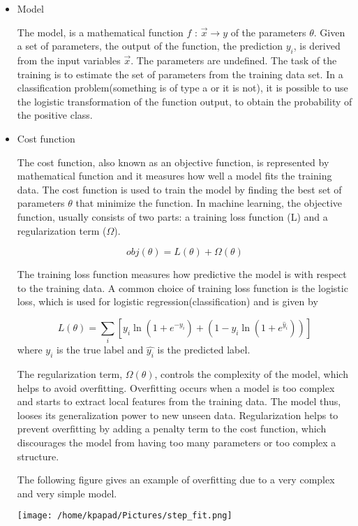 \begin{itemize}
\item Model
\label{sec:org31e7a41}

The model, is a mathematical function \(f\text{ : } \vec{x} \rightarrow y\) of the parameters \(\theta\). Given a set of parameters, the output of the function, the prediction \(y_{i}\), is derived from the input variables \(\vec{x}\).
The parameters are undefined. The task of the training is to estimate the set of parameters from the training data set.
In a classification problem(something is of type a or it is not), it is possible to use the logistic transformation of the function output, to obtain the probability of the positive class.

\item Cost function
\label{sec:orgac31e22}

The cost function, also known as an objective function, is represented by mathematical function and it measures how well a model fits the training data. The cost function is used to train the model by finding the best set of parameters \(\theta\) that minimize the function.
In machine learning, the objective function, usually consists of two parts: a training loss function (L) and a regularization term (\(\Omega\)).

\[
obj(\theta) = L(\theta) + \Omega(\theta)
\]

The training loss function measures how predictive the model is with respect to the training data. A common choice of training loss function is the logistic loss, which is used for logistic regression(classification) and is given by

\[
L(\theta) = \sum_{i}[ y_{i}\ln(1+e^{-\hat{y_{i}}})+(1-y_{i}\ln(1+e^{\hat{y}_{i}}))]
\]
where \(y_{i}\) is the true label and \(\hat{y_{i}}\) is the predicted label.

The regularization term, \(\Omega(\theta)\), controls the complexity of the model, which helps to avoid overfitting. Overfitting occurs when a model is too complex and starts to extract local features from the training data. The model thus, looses its generalization power to new unseen data. Regularization helps to prevent overfitting by adding a penalty term to the cost function, which discourages the model from having too many parameters or too complex a structure.

The following figure gives an example of overfitting due to a very complex and very simple model.
\begin{center}
\texttt{[image: /home/kpapad/Pictures/step\_fit.png]}
\end{center}
\end{itemize}

